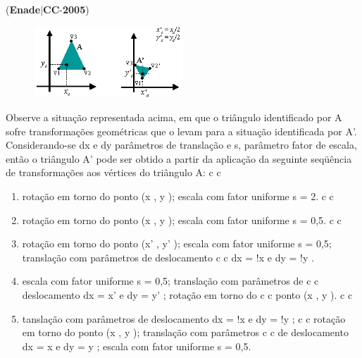 \documentclass{exam}
\begin{document}
\begin{questions}
\begin{enumerate}[label=\alph*)]
	\end{enumerate}

\question (\textbf{Enade}$|$\textbf{CC}-\textbf{2005}) \begin{figure}[H]
	\begin{center}
		\includegraphics[width=0.5\textwidth]{CIENCIA_DA_COMPUTACAO_Prova2005-utf8_figuras/fig-0041.jpg}
	\end{center}
\end{figure}
Observe a situação representada acima, em que o triângulo
identificado por A sofre transformações geométricas que o levam para
a situação identificada por A’. Considerando-se dx e dy parâmetros
de translação e s, parâmetro fator de escala, então o triângulo A’ pode
ser obtido a partir da aplicação da seguinte seqüência de
transformações aos vértices do triângulo A:
c c
	\begin{enumerate}[label=\alph*)]
		\item  rotação em torno do ponto (x , y ); escala com fator uniforme
s = 2.
c c
		\item  rotação em torno do ponto (x , y ); escala com fator uniforme
s = 0,5.
c c
		\item  rotação em torno do ponto (x' , y' ); escala com fator
uniforme s = 0,5; translação com parâmetros de deslocamento
c c
dx = !x e dy = !y .
		\item  escala com fator uniforme s = 0,5; translação com parâmetros de
c c
deslocamento dx = x' e dy = y' ; rotação em torno do
c c
ponto (x , y ).
c c
		\item  tanslação com parâmetros de deslocamento dx = !x e dy = !y ;
c c
rotação em torno do ponto (x , y ); translação com parâmetros
c c
de deslocamento dx = x e dy = y ; escala com fator uniforme
s = 0,5.

	\end{enumerate}


\end{questions}
\end{document}
